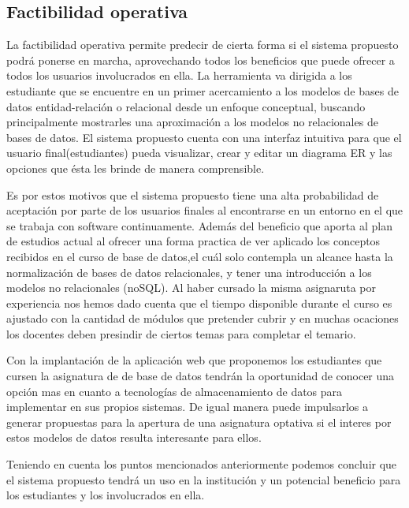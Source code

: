 
\subsection*{Factibilidad operativa}


La factibilidad operativa permite predecir de cierta forma si el sistema propuesto podrá ponerse en marcha, aprovechando todos los beneficios que puede ofrecer a todos los usuarios involucrados en ella. La herramienta va dirigida a los estudiante que se encuentre en un primer acercamiento a los modelos de bases de datos entidad-relación o relacional desde un enfoque conceptual, buscando principalmente mostrarles una aproximación a los modelos no relacionales de bases de datos. El sistema propuesto cuenta con una interfaz intuitiva para que el usuario final(estudiantes) pueda visualizar, crear y editar un diagrama ER y las opciones que ésta les brinde de manera comprensible.


Es por estos motivos que el sistema propuesto tiene una alta probabilidad de aceptación por parte de los usuarios finales al encontrarse en un entorno en el que se trabaja con software continuamente. Además del beneficio que aporta al plan de estudios actual al ofrecer una forma practica de ver aplicado los conceptos recibidos en el curso de base de datos,el cuál solo contempla un alcance hasta la normalización de bases de datos relacionales, y tener una introducción a los modelos no relacionales (noSQL). Al haber cursado la misma asignaruta por experiencia nos hemos dado cuenta que el tiempo disponible durante el curso es ajustado con la cantidad de módulos que pretender cubrir y en muchas ocaciones los docentes deben presindir de ciertos temas para completar el temario.

Con la implantación de la aplicación web que proponemos los estudiantes que cursen la asignatura de de base de datos tendrán la oportunidad de conocer una opción mas en cuanto a tecnologías de almacenamiento de datos para implementar en sus propios sistemas. De igual manera puede impulsarlos a generar propuestas para la apertura de una asignatura optativa si el interes por estos modelos de datos resulta interesante para ellos.

Teniendo en cuenta los puntos mencionados anteriormente podemos concluir que el sistema propuesto tendrá un uso en la institución y un potencial beneficio para los estudiantes y los involucrados en ella.

